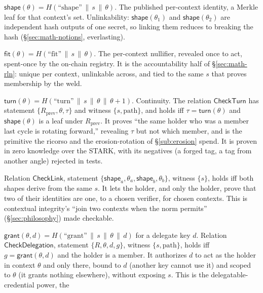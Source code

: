 \documentclass[11pt]{article}
\begin{document}
\begin{description}[leftmargin=1.3em,itemsep=0.28em]
\item[1. shape.] $\mathsf{shape}(\theta) = H(\text{``shape''} \,\|\, s \,\|\, \theta)$.
The published per-context identity, a Merkle leaf for that context's set. Unlinkability:
$\mathsf{shape}(\theta_1)$ and $\mathsf{shape}(\theta_2)$ are independent hash outputs of
one secret, so linking them reduces to breaking the hash (\S\ref{sec:math-notions},
everlasting).
\item[2. fit.] $\mathsf{fit}(\theta) = H(\text{``fit''} \,\|\, s \,\|\, \theta)$. The
per-context nullifier, revealed once to act, spent-once by the on-chain registry. It is the
accountability half of \S\ref{sec:math-rln}: unique per context, unlinkable across, and
tied to the same $s$ that proves membership by the weld.
\item[3. turn.] $\mathsf{turn}(\theta) = H(\text{``turn''} \,\|\, s \,\|\, \theta \,\|\,
\theta{+}1)$. Continuity. The relation $\mathsf{CheckTurn}$ has statement
$\{R_{\text{prev}}, \theta, \tau\}$ and witness $\{s, \text{path}\}$, and holds iff
$\tau = \mathsf{turn}(\theta)$ and $\mathsf{shape}(\theta)$ is a leaf under $R_{\text{prev}}$.
It proves ``the same holder who was a member last cycle is rotating forward,'' revealing
$\tau$ but not which member, and is the primitive the ricorso and the erosion-rotation of
\S\ref{sub:erosion} spend. It is proven in zero knowledge over the STARK, with its
negatives (a forged tag, a tag from another angle) rejected in tests.
\item[4. link.] Relation $\mathsf{CheckLink}$, statement $\{\mathsf{shape}_a, \theta_a,
\mathsf{shape}_b, \theta_b\}$, witness $\{s\}$, holds iff both shapes derive from the same
$s$. It lets the holder, and only the holder, prove that two of their identities are one,
to a chosen verifier, for chosen contexts. This is contextual integrity's ``join two
contexts when the norm permits'' (\S\ref{sec:philosophy}) made checkable.
\item[5. grant.] $\mathsf{grant}(\theta, d) = H(\text{``grant''} \,\|\, s \,\|\, \theta
\,\|\, d)$ for a delegate key $d$. Relation $\mathsf{CheckDelegation}$, statement
$\{R, \theta, d, g\}$, witness $\{s, \text{path}\}$, holds iff $g = \mathsf{grant}(\theta,d)$
and the holder is a member. It authorizes $d$ to act as the holder in context $\theta$ and
only there, bound to $d$ (another key cannot use it) and scoped to $\theta$ (it grants
nothing elsewhere), without exposing $s$. This is the delegatable-credential power, the

\end{description}
\end{document}
